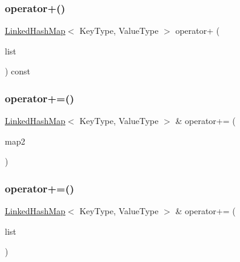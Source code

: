 \mbox{\label{classLinkedHashMap_af9702bd0fcc2d2320899006cd659f934}} 
\subsubsection{\texorpdfstring{operator+()}{operator+()}\hspace{0.1cm}{\footnotesize\ttfamily [2/2]}}
{\footnotesize\ttfamily \mbox{\hyperlink{classLinkedHashMap}{Linked\+Hash\+Map}}$<$ Key\+Type, Value\+Type $>$ operator+ (\begin{DoxyParamCaption}\item[{std\+::initializer\+\_\+list$<$ std\+::pair$<$ Key\+Type, Value\+Type $>$ $>$}]{list }\end{DoxyParamCaption}) const}

\mbox{\label{classLinkedHashMap_a41cb6fea75c4d49ba2c9d3880980a520}} 
\subsubsection{\texorpdfstring{operator+=()}{operator+=()}\hspace{0.1cm}{\footnotesize\ttfamily [1/2]}}
{\footnotesize\ttfamily \mbox{\hyperlink{classLinkedHashMap}{Linked\+Hash\+Map}}$<$ Key\+Type, Value\+Type $>$ \& operator+= (\begin{DoxyParamCaption}\item[{const \mbox{\hyperlink{classLinkedHashMap}{Linked\+Hash\+Map}}$<$ Key\+Type, Value\+Type $>$ \&}]{map2 }\end{DoxyParamCaption})}

\mbox{\label{classLinkedHashMap_a7aa2b6c68b448ea09e21f0b662035d4c}} 
\subsubsection{\texorpdfstring{operator+=()}{operator+=()}\hspace{0.1cm}{\footnotesize\ttfamily [2/2]}}
{\footnotesize\ttfamily \mbox{\hyperlink{classLinkedHashMap}{Linked\+Hash\+Map}}$<$ Key\+Type, Value\+Type $>$ \& operator+= (\begin{DoxyParamCaption}\item[{std\+::initializer\+\_\+list$<$ std\+::pair$<$ Key\+Type, Value\+Type $>$ $>$}]{list }\end{DoxyParamCaption})}

